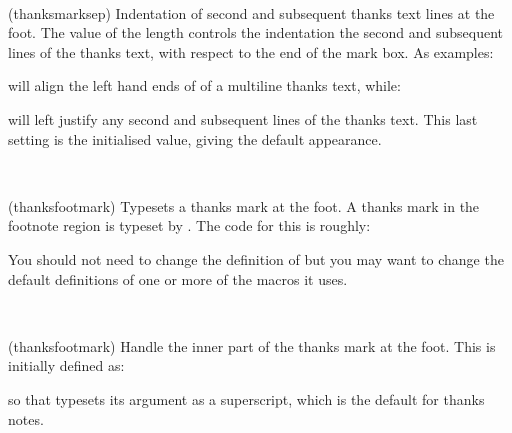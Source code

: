 \begin{syntax}
\lnc{\thanksmarksep} \\
\end{syntax}
\glossary(thanksmarksep)%
  {}%
  {Indentation of second and subsequent thanks text lines at the foot.}
The value of the length
 \lnc{\thanksmarksep} controls the indentation the
second and subsequent lines of the thanks text, with respect to
the end of the mark box. As examples: 
\begin{lcode}
\setlength{\thanksmarksep}{0em}
\end{lcode}
 will align the left hand ends of of a multiline thanks text, while: 
\begin{lcode}
\setlength{\thanksmarksep}{-\thanksmarkwidth}
\end{lcode}
will left justify any second and subsequent lines of the thanks text. 
This last
setting is the initialised value, giving the default appearance.

\begin{syntax}
\cmd{\thanksfootmark} \\
\end{syntax}
\glossary(thanksfootmark)%
  {}%
  {Typesets a thanks mark at the foot.}
    A thanks mark in the footnote region is typeset by \cmd{\thanksfootmark}.
The code for this is roughly:
\begin{lcode}
\newcommand{\thanksfootmark}{%
  \hbox to\thanksmarkwidth{\hfil\normalfont%
     \thanksscript{\thefootnote}}}
\end{lcode}
You should not need to change the definition
of \cmd{\thanksfootmark} 
but you may want to change the default definitions of one or more
of the macros it uses.

\begin{syntax}
\cmd{\thanksscript} \\
\end{syntax}
\glossary(thanksfootmark)%
  {}%
  {Handle the inner part of the thanks mark at the foot.}
This is initially defined as: 
\begin{lcode}
\newcommand{\thanksscript}[1]{\textsuperscript{#1}}
\end{lcode}
so that \cmd{\thanksscript} typesets its argument as a superscript, which
is the default for thanks notes.



